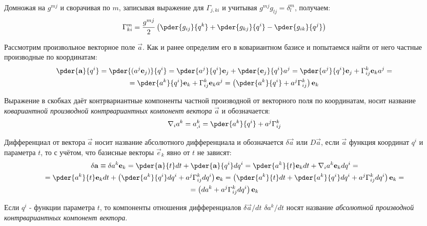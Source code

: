 Домножая на \( g^{mj} \) и сворачивая по \( m \), записывая выражение для
\( \Gamma_{j,ki} \) и учитывая \( g^{mj}g_{lj} = \delta^m_l \), получаем:
\[
    \Gamma^m_{ki} = \frac{g^{mj}}{2}\left(
        \pder{g_{ij}}{q^k}+
        \pder{g_{kj}}{q^i}-
        \pder{g_{ik}}{q^j}   
        \right)
\]  

Рассмотрим произвольное векторное поле \( \vec{a} \). Как и ранее определим его
в ковариантном базисе и попытаемся найти от него частные производные по
координатам:
\begin{gather*}
    \pder{\vec{a}}{q^i} = 
    \pder{(a^j \vec{e}_{j})}{q^i} = 
    \pder{a^j}{q^i}\vec{e}_{j} + \pder{ \vec{e}_{j}}{q^i} a^j =
    \pder{a^j}{q^i}\vec{e}_{j} + \Gamma^k_{ij} \vec{e}_{k} a^j =\\=
    \pder{a^k}{q^i}\vec{e}_{k} + \Gamma^k_{ij} \vec{e}_{k} a^j =
    \left(\pder{a^k}{q^i} + a^j \Gamma^k_{ij}\right)\vec{e}_{k}      
\end{gather*}

Выражение в скобках даёт контрвариантные компоненты частной производной от
векторного поля по координатам, носит название \emph{ковариантной производной
контрвариантных компонент вектора } \( \vec{a} \) и обозначается:
\[
    \nabla_i a^k = a^k_{,i} = \pder{a^k}{q^i} + a^j \Gamma^k_{ij}
\]
    
Дифференциал от вектора \( \vec{a} \) носит название абсолютного дифференциала
и обозначается \( \delta  \vec{a} \) или \( D  \vec{a} \), если \( \vec{a} \)
функция координат \( q^i \) и параметра \( t \), то с учётом, что базисные
векторы \( \vec{e}_{k} \) явно от \( t \) не зависят:
\begin{gather*}
    \delta  \vec{a} \equiv \delta a^k \vec{e}_{k}= 
    \pder{\vec{a}}{t} dt + \pder{ \vec{a}}{q^i} dq^i = 
    \pder{a^k}{t} \vec{e}_{k} dt  + \nabla_i a^k \vec{e}_{k} dq^i =\\ =
    \pder{a^k}{t}\vec{e}_{k} dt  + \left(\pder{a^k}{q^i}dq^i + a^j \Gamma^k_{ij} dq^i\right) \vec{e}_{k} = 
    \left(\pder{a^k}{t} dt+\pder{a^k}{q^i}dq^i + a^j \Gamma^k_{ij} dq^i\right) \vec{e}_{k} = \\ =
    \left(d{a^k} + a^j \Gamma^k_{ij} dq^i\right) \vec{e}_{k}
\end{gather*}
    
Если \( q^i \) - функции параметра \( t \), то компоненты отношения
дифференциалов \( \delta\vec{a}/dt \) \( \delta a^k/dt \) носят название
\emph{абсолютной производной контрвариантных компонент вектора}.

\newpage
